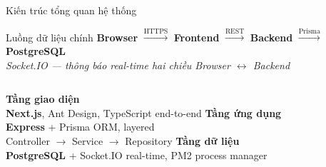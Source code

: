 \documentclass[aspectratio=43,xcolor=table]{beamer}
\begin{document}
\begin{frame}{Kiến trúc tổng quan hệ thống}
  \centering
  \begin{block}{Luồng dữ liệu chính}
    \centering\normalsize
    \textcolor{hustred}{\textbf{Browser}} $\xrightarrow{\text{HTTPS}}$
    \textcolor{hustred}{\textbf{Frontend}} $\xrightarrow{\text{REST}}$
    \textcolor{hustred}{\textbf{Backend}} $\xrightarrow{\text{Prisma}}$
    \textcolor{hustred}{\textbf{PostgreSQL}}\\[0.2cm]
    \footnotesize \textcolor{hustdark}{\textit{Socket.IO --- thông báo real-time hai chiều Browser $\leftrightarrow$ Backend}}
  \end{block}

  \vspace{0.3cm}
  \begin{columns}[T,onlytextwidth]
    \textbf{\textcolor{hustred}{Tầng giao diện}}\\
    \scriptsize \textbf{Next.js}, Ant Design, TypeScript end-to-end
    \textbf{\textcolor{hustred}{Tầng ứng dụng}}\\
    \scriptsize \textbf{Express} + Prisma ORM, layered\\Controller $\to$ Service $\to$ Repository
    \textbf{\textcolor{hustred}{Tầng dữ liệu}}\\
    \scriptsize \textbf{PostgreSQL} + Socket.IO real-time, PM2 process manager
  \end{columns}
\end{frame}
\end{document}
